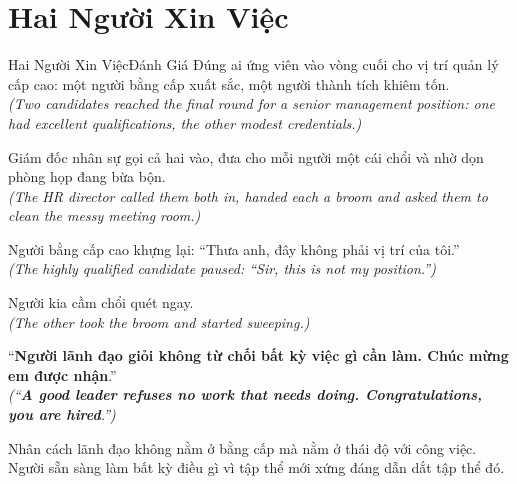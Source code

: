 \section{Hai Người Xin Việc}
\begin{truyen}{Hai Người Xin Việc}{Đánh Giá Đúng}
ai ứng viên vào vòng cuối cho vị trí quản lý cấp cao: một người bằng cấp xuất sắc, một người thành tích khiêm tốn.\\
\textit{(Two candidates reached the final round for a senior management position: one had excellent qualifications, the other modest credentials.)}

Giám đốc nhân sự gọi cả hai vào, đưa cho mỗi người một cái chổi và nhờ dọn phòng họp đang bừa bộn.\\
\textit{(The HR director called them both in, handed each a broom and asked them to clean the messy meeting room.)}

Người bằng cấp cao khựng lại: ``Thưa anh, đây không phải vị trí của tôi.''\\
\textit{(The highly qualified candidate paused: ``Sir, this is not my position.'')}

Người kia cầm chổi quét ngay.\\
\textit{(The other took the broom and started sweeping.)}

``\textbf{Người lãnh đạo giỏi không từ chối bất kỳ việc gì cần làm. Chúc mừng em được nhận}.''\\
\textit{(``\textbf{A good leader refuses no work that needs doing. Congratulations, you are hired}.'')}
\end{truyen}
\begin{baihoc}
  Nhân cách lãnh đạo không nằm ở bằng cấp mà nằm ở thái độ với công việc. Người sẵn sàng làm bất kỳ điều gì vì tập thể mới xứng đáng dẫn dắt tập thể đó.
\end{baihoc}

